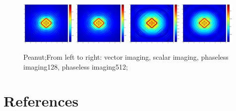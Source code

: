 \documentclass[12pt]{iopart}
\begin{document}
\begin{figure}
	\centering
	\includegraphics[width=0.24\textwidth]{./graphic_phase/rectangle_r_10_k_4_vector.eps}
	\includegraphics[width=0.24\textwidth]{./graphic_phase/rectangle_r_10_k_4_scalar.eps}
	\includegraphics[width=0.24\textwidth]{./graphic_phase/rectangle_r_10_k_4_phaseless_n_128_bias_100.eps}
	\includegraphics[width=0.24\textwidth]{./graphic_phase/rectangle_r_10_k_4_phaseless_n_512_bias_100.eps}
	\caption{Peanut;From left to right: vector imaging, scalar imaging, phaseless imaging128, phaseless imaging512;  }\label{figure_rectangle_phaless}
\end{figure}
\section*{References}

\end{document}
